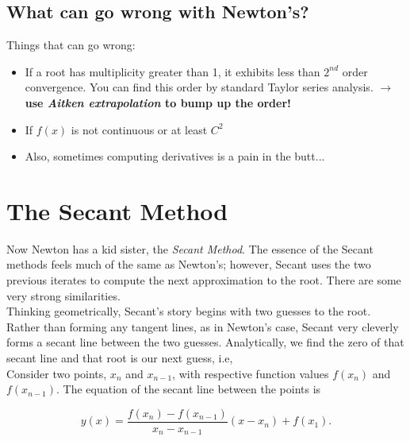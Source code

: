 \documentclass[paper=a4, fontsize=11pt]{scrartcl} %
\numberwithin{equation}{section} %
\numberwithin{figure}{section} %
\numberwithin{table}{section} %
\begin{document}
\subsection{What can go wrong with Newton's?}

$ $\\

Things that can go wrong:\\

\begin{itemize}
\item If a root has multiplicity greater than 1, it exhibits less than $2^{nd}$ order convergence. You can find this order by standard Taylor series analysis. {\bf{$\rightarrow$ use \emph{Aitken extrapolation} to bump up the order!}}
\item If $f(x)$ is not continuous or at least $C^2$
\item Also, sometimes computing derivatives is a pain in the butt...
\end{itemize}







%
%

\section{The Secant Method}

Now Newton has a kid sister, the \emph{Secant Method}. The essence of the Secant methods feels much of the same as Newton's; however, Secant uses the two previous iterates to compute the next approximation to the root. There are some very strong similarities.\\

Thinking geometrically, Secant's story begins with two guesses to the root. Rather than forming any tangent lines, as in Newton's case, Secant very cleverly forms a secant line between the two guesses. Analytically, we find the zero of that secant line and that root is our next guess, i.e, \\

Consider two points, $x_n$ and $x_{n-1}$, with respective function values $f(x_n)$ and $f(x_{n-1})$. The equation of the secant line between the points is

$$y(x) = \frac{ f(x_n) - f(x_{n-1}) }{ x_n - x_{n-1} } (x - x_{n}) + f(x_1).$$
\end{document}
